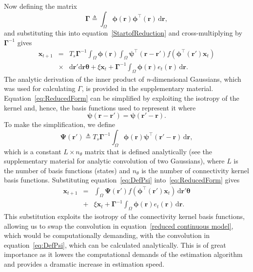 \documentclass[12pt]{iopart}
\begin{document}
Now defining the matrix
\begin{equation}\label{eq:DefGamma}
	\boldsymbol{\Gamma} \triangleq \int_\Omega {\boldsymbol{\phi} \left(\mathbf{r}\right)\boldsymbol{\phi} ^{\top}\left(\mathbf{r}\right) \, \textrm{d}\mathbf{r}}, 
\end{equation}
and substituting this into equation~\ref{StartofReduction} and cross-multiplying by $\boldsymbol{\Gamma}^{-1}$ gives
\begin{eqnarray}
    \label{eq:ReducedForm}
	 \mathbf{x}_{t+1} &=& T_s\boldsymbol{\Gamma}^{-1}
	 \int_\Omega \boldsymbol{\phi}(\mathbf{r}) 
	 \int_\Omega \boldsymbol{\psi}^{\top} (\mathbf{r}-\mathbf{r}')f(\boldsymbol{\phi}^{\top}(\mathbf{r}')\mathbf{x}_t) \nonumber \\
	&\times& \textrm{d}\mathbf{r}' \textrm{d}\mathbf{r} \boldsymbol{\theta}  
	 + \xi\mathbf{x}_t + \boldsymbol{\Gamma}^{-1} \int_\Omega{\boldsymbol{\phi}(\mathbf{r}) e_t(\mathbf{r}) \, \textrm{d}\mathbf{r}}.
\end{eqnarray}
The analytic derivation of the inner product of \emph{n}-dimensional Gaussians, which was used for calculating $\Gamma$, is provided in the supplementary material. Equation~\ref{eq:ReducedForm} can be simplified by exploiting the isotropy of the kernel and, hence, the basis functions used to represent it where
\begin{equation}
	\boldsymbol{\psi} (\mathbf{r}-\mathbf{r}') = \boldsymbol{\psi} (\mathbf{r}'-\mathbf{r}).
\end{equation}
To make the simplification, we define
\begin{equation}\label{eq:DefPsi}
	\boldsymbol{\Psi}(\mathbf{r}') \triangleq T_s\boldsymbol{\Gamma}^{-1}\int_\Omega {\boldsymbol{\phi}(\mathbf{r})\boldsymbol{\psi}^{\top} (\mathbf{r}'-\mathbf{r}) \, \textrm{d}\mathbf{r}},
\end{equation}
which is a constant $L \times n_{\theta}$ matrix that is defined analytically (see the supplementary material for analytic convolution of two Gaussians), where $L$ is the number of basis functions (states) and $n_{\theta}$ is the number of connectivity kernel basis functions. Substituting equation~\ref{eq:DefPsi} into~\ref{eq:ReducedForm} gives
\begin{eqnarray}
	\mathbf{x}_{t+1} &=& \int_\Omega \boldsymbol{\Psi}(\mathbf{r}') f(\boldsymbol{\phi}^{\top}(\mathbf{r}')\mathbf{x}_t) \, \textrm{d}\mathbf{r}' \boldsymbol{\theta} \nonumber \\ &+& \xi\mathbf{x}_t 
+ \boldsymbol{\Gamma}^{-1} \int_\Omega{\boldsymbol{\phi}(\mathbf{r})e_t(\mathbf{r}) \, \textrm{d}\mathbf{r}}.
\end{eqnarray}
This substitution exploits the isotropy of the connectivity kernel basis functions, allowing us to swap the convolution in equation~\ref{reduced continuous model}, which would be computationally demanding, with the convolution in equation~\ref{eq:DefPsi}, which can be calculated analytically. This is of great importance as it lowers the computational demands of the estimation algorithm and provides a dramatic increase in estimation speed. 
\end{document}
